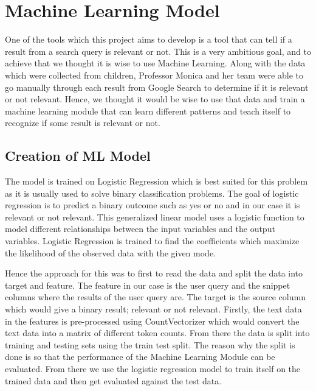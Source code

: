 \documentclass[50pt]{usiinfbachelorproject}
\begin{document}
\section{Machine Learning Model}
\label{sec:machine_learning_model}
One of the tools which this project aims to develop is a tool that can tell if a result from a search query is relevant or not. This is a very ambitious goal, and to achieve that we thought it is wise to use Machine Learning. Along with the data which were collected from children, Professor Monica and her team were able to go manually through each result from Google Search to determine if it is relevant or not relevant. Hence, we thought it would be wise to use that data and train a machine learning module that can learn different patterns and teach itself to recognize if some result is relevant or not. 

\subsection{Creation of ML Model}
The model is trained on Logistic Regression \cite{lavalley2008logistic} which is best suited for this problem as it is usually used to solve binary classification problems. The goal of logistic regression is to predict a binary outcome such as yes or no and in our case it is relevant or not relevant. This generalized linear model uses a logistic function to model different relationships between the input variables and the output variables. Logistic Regression is trained to find the coefficients which maximize the likelihood of the observed data with the given mode. 

Hence the approach for this was to first to read the data and split the data into target and feature. The feature in our case is the user query and the snippet columns where the results of the user query are. The target is the source column which would give a binary result; relevant or not relevant. Firstly, the text data in the features is pre-processed using CountVectorizer which would convert the text data into a matrix of different token counts. From there the data is split into training and testing sets using the train test split. The reason why the split is done is so that the performance of the Machine Learning Module can be evaluated. From there we use the logistic regression model to train itself on the trained data and then get evaluated against the test data. 
\end{document}
